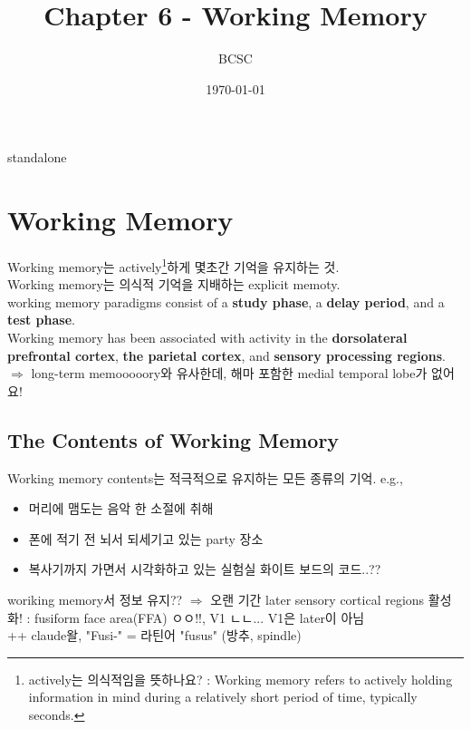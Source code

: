 \documentclass[../note.tex]{subfiles}
\title{Chapter 6 - Working Memory}
\author{BCSC}
\date{\today}
\providecommand{\mainfile}{standalone}
\begin{document}
\ifx\mainfile\empty\else
    \maketitle
    \newpage
\fi

\setcounter{chapter}{5}
\chapter{Working Memory}
Working memory는 actively\footnote{actively는 의식적임을 뜻하나요? : Working memory refers to actively holding information in mind during
a relatively short period of time, typically seconds.}하게 몇초간 기억을 유지하는 것.\\
Working memory는 의식적 기억을 지배하는 explicit memoty.\\

working memory paradigms consist of a \textbf{study phase}, a \textbf{delay period}, and a \textbf{test phase}.\\

Working memory has been associated with activity
in the \textbf{dorsolateral prefrontal cortex}, \textbf{the parietal cortex}, and \textbf{sensory
processing regions}.\\
$\Longrightarrow$ long-term memooooory와 유사한데, 해마 포함한 medial temporal lobe가 없어요!

\section{The Contents of Working Memory}
Working memory contents는 적극적으로 유지하는 모든 종류의 기억. e.g.,
\begin{itemize}
  \item 머리에 맴도는 음악 한 소절에 취해
  \item 폰에 적기 전 뇌서 되세기고 있는 party 장소
  \item 복사기까지 가면서 시각화하고 있는 실험실 화이트 보드의 코드..??
\end{itemize}

woriking memory서 정보 유지?? $\Longrightarrow$ 오랜 기간 later sensory cortical regions 활성화!
: fusiform face area(FFA) ㅇㅇ!!, V1 ㄴㄴ... V1은 later이 아님\\

++ claude왈, "Fusi-" = 라틴어 "fusus" (방추, spindle)\\
\end{document}
